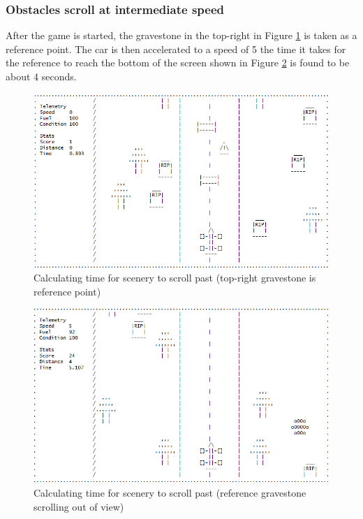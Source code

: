 \documentclass{article}
\begin{document}
\subsubsection*{Obstacles scroll at intermediate speed}
After the game is started, the gravestone in the top-right in Figure \ref{fig:obs_test_midspeedscroll} is taken as a reference point. The car is then accelerated to a speed of 5 the time it takes for the reference to reach the bottom of the screen shown in Figure \ref{fig:obs_test_midspeedscroll2} is found to be about 4 seconds.
\begin{figure}[!ht]
	\begin{center}
	\includegraphics[width=0.63\paperwidth]{images/obs_test_midspeedscroll}
	\caption{Calculating time for scenery to scroll past (top-right gravestone is reference point)}
	\label{fig:obs_test_midspeedscroll} 
	\end{center}
\end{figure}
\begin{figure}[!ht]
	\begin{center}
	\includegraphics[width=0.63\paperwidth]{images/obs_test_midspeedscroll2}
	\caption{Calculating time for scenery to scroll past (reference gravestone scrolling out of view)}
	\label{fig:obs_test_midspeedscroll2} 
	\end{center}
\end{figure}
\newpage
\end{document}
